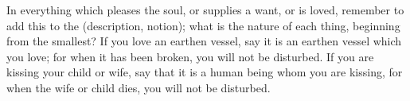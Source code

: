 In everything which pleases the soul, or supplies a want, or is loved, remember
to add  this to the  (description, notion); what is  the nature of  each thing,
beginning  from the  smallest? If  you love  an earthen  vessel, say  it is  an
earthen vessel  which you love; for  when it has  been broken, you will  not be
disturbed. If you are kissing your child or  wife, say that it is a human being
whom  you are  kissing,  for when  the  wife or  child dies,  you  will not  be
disturbed.
